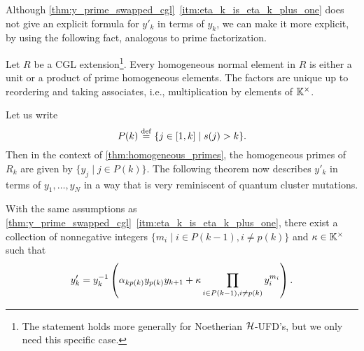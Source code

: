 Although \cref{thm:y_prime_swapped_cgl}~\ref*{itm:eta_k_is_eta_k_plus_one} does not
give an explicit formula for $y'_k$ in terms of $y_k$, we can make it more explicit, by
using the following fact, analogous to prime factorization.
\begin{theorem}\label{thm:normal_in_UFD}
	Let $R$ be a CGL extension\footnote{The statement holds more generally for Noetherian
		$\mathcal{H}$-UFD's, but we only need this specific case.}. Every homogeneous normal element
	in $R$ is either a unit or a product of prime homogeneous elements. The factors are
	unique up to reordering and taking associates, i.e., multiplication
	by elements of $\mathbb{K}^\times$.
\end{theorem}
Let us write
\begin{equation}\label{eq:P_of_k}
	P(k) \overset{\mathrm{def}}{=} \{j \in [1,  k] \mid s(j) > k\}.
\end{equation}
%
Then in the context of \cref{thm:homogeneous_primes}, the homogeneous primes of $R_k$
are given by $\{y_j \mid j \in P(k)\}$. The following theorem now describes $y'_k$ in
terms of $y_1, \dots, y_N$ in a way that is very reminiscent of quantum cluster
mutations.
\begin{theorem}\label{thm:almost_cluster_mutation}
	With the same assumptions as
	\cref{thm:y_prime_swapped_cgl}~\ref*{itm:eta_k_is_eta_k_plus_one}, there exist a
	collection of nonnegative integers $\{m_i \mid i \in P(k-1), i\neq p(k)\}$ and $\kappa
		\in \mathbb{K}^\times$ such that
	\begin{equation*}
		y'_k = y_k^{-1} \left(\alpha_{kp(k)}y_{p(k)}y_{k+1} + \kappa \prod_{i \in P(k-1), i\neq p(k)} y_i^{m_i}\right).
	\end{equation*}
\end{theorem}
